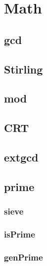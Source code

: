 \section{Math}

\subsection{gcd}


\subsection{Stirling}


\subsection{mod}
\subsection{CRT}

\subsection{extgcd}


\subsection{prime}
\subsubsection{sieve}


\subsubsection{isPrime}


\subsubsection{genPrime}


% 

